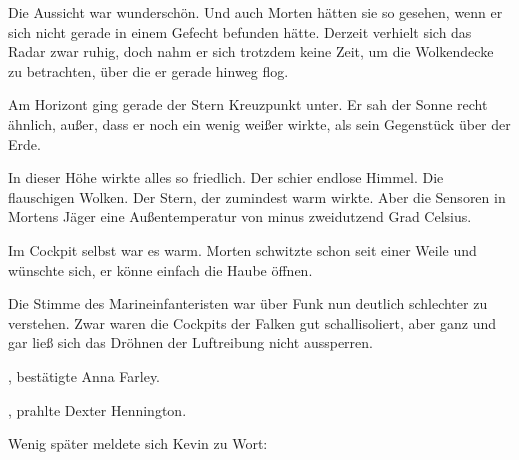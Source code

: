 Die Aussicht war wunderschön. Und auch Morten hätten sie so gesehen, wenn er sich nicht gerade in einem Gefecht befunden hätte. Derzeit verhielt sich das Radar zwar ruhig, doch nahm er sich trotzdem keine Zeit, um die Wolkendecke zu betrachten, über die er gerade hinweg flog.

\par

Am Horizont ging gerade der Stern Kreuzpunkt unter. Er sah der Sonne recht ähnlich, außer, dass er noch ein wenig weißer wirkte, als sein Gegenstück über der Erde.

\par

In dieser Höhe wirkte alles so friedlich. Der schier endlose Himmel. Die flauschigen Wolken. Der Stern, der zumindest warm wirkte. Aber die Sensoren in Mortens Jäger eine Außentemperatur von minus zweidutzend Grad Celsius.

\par

Im Cockpit selbst war es warm. Morten schwitzte schon seit einer Weile und wünschte sich, er könne einfach die Haube öffnen.

\par

 Die Stimme des Marineinfanteristen war über Funk nun deutlich schlechter zu verstehen. Zwar waren die Cockpits der Falken gut schallisoliert, aber ganz und gar ließ sich das Dröhnen der Luftreibung nicht aussperren. 

\par

, bestätigte Anna Farley. 

\par

, prahlte Dexter Hennington.

\par

Wenig später meldete sich Kevin zu Wort: 

\par

